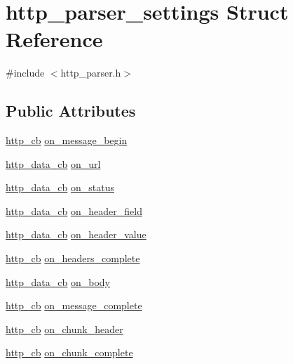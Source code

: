 \hypertarget{structhttp__parser__settings}{\section{http\-\_\-parser\-\_\-settings Struct Reference}
\label{structhttp__parser__settings}
}


{\ttfamily \#include $<$http\-\_\-parser.\-h$>$}

\subsection*{Public Attributes}
\begin{DoxyCompactItemize}
\item 
\hyperlink{http__parser_8h_a4d8e134ed157e38ce183e8db8b9e8c35}{http\-\_\-cb} \hyperlink{structhttp__parser__settings_ac44144daecc8e8adbd477b7e6a794e26}{on\-\_\-message\-\_\-begin}
\item 
\hyperlink{http__parser_8h_a055ecd54750d71f2b3eda6294dd4b782}{http\-\_\-data\-\_\-cb} \hyperlink{structhttp__parser__settings_a9c24dfa900b49bf3439bbfba572b42fb}{on\-\_\-url}
\item 
\hyperlink{http__parser_8h_a055ecd54750d71f2b3eda6294dd4b782}{http\-\_\-data\-\_\-cb} \hyperlink{structhttp__parser__settings_a6d0f0203f3461a8889ad471de119c993}{on\-\_\-status}
\item 
\hyperlink{http__parser_8h_a055ecd54750d71f2b3eda6294dd4b782}{http\-\_\-data\-\_\-cb} \hyperlink{structhttp__parser__settings_acfb3fd7947c5ff3e16649c71aa13bff2}{on\-\_\-header\-\_\-field}
\item 
\hyperlink{http__parser_8h_a055ecd54750d71f2b3eda6294dd4b782}{http\-\_\-data\-\_\-cb} \hyperlink{structhttp__parser__settings_a2af4e9085fa79ee52b31e626179bc561}{on\-\_\-header\-\_\-value}
\item 
\hyperlink{http__parser_8h_a4d8e134ed157e38ce183e8db8b9e8c35}{http\-\_\-cb} \hyperlink{structhttp__parser__settings_a743b24c8f33e0f1cf60a96c824c42071}{on\-\_\-headers\-\_\-complete}
\item 
\hyperlink{http__parser_8h_a055ecd54750d71f2b3eda6294dd4b782}{http\-\_\-data\-\_\-cb} \hyperlink{structhttp__parser__settings_aaa145d7c24c91f471b2079ecb6368ae4}{on\-\_\-body}
\item 
\hyperlink{http__parser_8h_a4d8e134ed157e38ce183e8db8b9e8c35}{http\-\_\-cb} \hyperlink{structhttp__parser__settings_afdd5beef93a4a7b32bc61ae088da64d2}{on\-\_\-message\-\_\-complete}
\item 
\hyperlink{http__parser_8h_a4d8e134ed157e38ce183e8db8b9e8c35}{http\-\_\-cb} \hyperlink{structhttp__parser__settings_a497cf8f9d68e06e54684b71ee0f9f828}{on\-\_\-chunk\-\_\-header}
\item 
\hyperlink{http__parser_8h_a4d8e134ed157e38ce183e8db8b9e8c35}{http\-\_\-cb} \hyperlink{structhttp__parser__settings_ac1c8453573094795ef41d4ba26e78846}{on\-\_\-chunk\-\_\-complete}
\end{DoxyCompactItemize}



